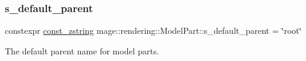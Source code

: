 \subsubsection{\texorpdfstring{s\+\_\+default\+\_\+parent}{s\_default\_parent}}
{\footnotesize\ttfamily constexpr \hyperlink{namespacemage_abfd9206dc607ceb5d13ec68bf075a5c0}{const\+\_\+zstring} mage\+::rendering\+::\+Model\+Part\+::s\+\_\+default\+\_\+parent = \char`\"{}root\char`\"{}\hspace{0.3cm}{\ttfamily [static]}}

The default parent name for model parts. 